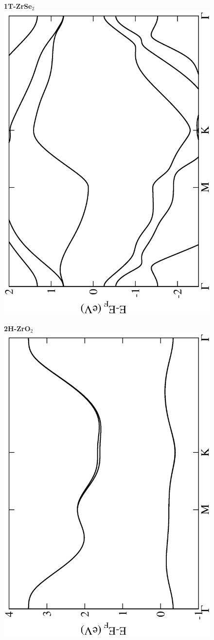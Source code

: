 \begin{figure}[htbp]
\centering
{\bfseries \sffamily 1T-ZrSe$_{2}$}\\
\includegraphics[width=0.45\linewidth, angle=-90, trim={2.9cm, 0cm, 2cm, 0cm}, clip]{img/SI_figs/BS/1T-ZrSe2.eps}
\end{figure}

\begin{figure}[htbp]
\centering
{\bfseries \sffamily 2H-ZrO$_{2}$}\\
\includegraphics[width=0.45\linewidth, angle=-90, trim={2.9cm, 0cm, 2cm, 0cm}, clip]{img/SI_figs/BS/2H-ZrO2.eps}
\end{figure}

